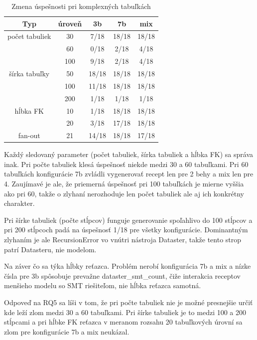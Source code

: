 \begin{table}[H]
    \centering
    \begin{tabular}{ccccc}
        \toprule
        Typ & úroveň & 3b & 7b  & mix\\
        \midrule
         počet tabuliek & 30 & 7/18  & 18/18  &  18/18 \\ 
                       & 60 & 0/18 & 2/18 & 4/18 \\ 
                       & 100 & 9/18  & 2/18  & 4/18\\ 
        \midrule
         šírka tabuľky & 50  & 18/18  & 18/18 & 18/18\\ 
                       & 100 & 11/18  & 18/18 & 18/18\\ 
                       & 200 & 1/18   & 1/18  & 1/18\\ 
        \midrule
         hĺbka FK      & 10 & 1/18  & 18/18 &  18/18\\ 
                       & 20 & 3/18  & 17/18 &  18/18\\
        \midrule
         fan-out       & 21 & 14/18 & 18/18 & 17/18\\ \bottomrule
        \end{tabular} 
        \caption{Zmena úspešnosti pri komplexných tabuľkách}
        \label{tab:zlozitost_schemy}
\end{table}

Každý sledovaný parameter (počet tabuliek, šírka tabuliek a hĺbka FK) sa správa inak. Pri počte tabuliek klesá úspešnosť niekde medzi 30 a 60 tabuľkami. Pri 60 tabuľkách konfigurácie 7b zvládli vygenerovať recept len pre 2 behy a mix len pre 4. Zaujímavé je ale, že priemerná úspešnosť pri 100 tabuľkách je mierne vyššia ako pri 60, takže o zlyhaní nerozhoduje len počet tabuliek ale aj ich konkrétny charakter.


Pri šírke tabuliek (počte stĺpcov) funguje generovanie spoľahlivo do 100 stĺpcov a pri 200 stĺpcoch padá na úspešnosť 1/18 pre všetky konfigurácie. Dominantným zlyhaním je ale RecursionError vo vnútri nástroja Dataster, takže tento strop patrí Datasteru, nie modelom. 


Na záver čo sa týka hĺbky reťazca. Problém nerobí konfigurácia 7b a mix a nízke čísla pre 3b spôsobuje prevažne dataster\_smt\_count, čiže interakcia receptov menšieho modelu so SMT riešiteľom, nie hĺbka reťazca samotná.


Odpoveď na RQ5 sa líši v tom, že pri počte tabuliek nie je možné presnejšie určiť kde leží zlom medzi 30 a 60 tabuľkami. Pri šírke tabuliek je to medzi 100 a 200 stĺpcami a pri hĺbke FK reťazca v meranom rozsahu 20 tabuľkových úrovní sa zlom pre konfigurácie 7b a mix neukázal.

